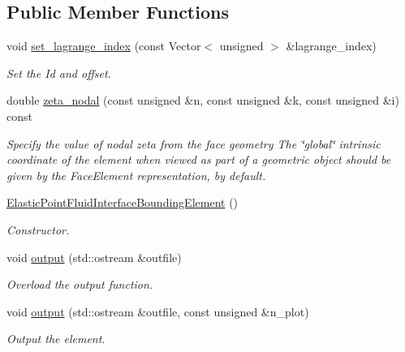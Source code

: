 \subsection*{Public Member Functions}
\begin{DoxyCompactItemize}
\item 
void \hyperlink{classoomph_1_1ElasticPointFluidInterfaceBoundingElement_a9a36ac6e616ed271507cbfe26de085b4}{set\+\_\+lagrange\+\_\+index} (const Vector$<$ unsigned $>$ \&lagrange\+\_\+index)
\begin{DoxyCompactList}\small\item\em Set the Id and offset. \end{DoxyCompactList}\item 
double \hyperlink{classoomph_1_1ElasticPointFluidInterfaceBoundingElement_a9d72fee284b866769347fb471c5828ad}{zeta\+\_\+nodal} (const unsigned \&n, const unsigned \&k, const unsigned \&i) const
\begin{DoxyCompactList}\small\item\em Specify the value of nodal zeta from the face geometry The \char`\"{}global\char`\"{} intrinsic coordinate of the element when viewed as part of a geometric object should be given by the Face\+Element representation, by default. \end{DoxyCompactList}\item 
\hyperlink{classoomph_1_1ElasticPointFluidInterfaceBoundingElement_a18e40e63a31953ad02cb0a2e7d0577b3}{Elastic\+Point\+Fluid\+Interface\+Bounding\+Element} ()
\begin{DoxyCompactList}\small\item\em Constructor. \end{DoxyCompactList}\item 
void \hyperlink{classoomph_1_1ElasticPointFluidInterfaceBoundingElement_a3a09e94ba3bf5ce0922bc4b75097078c}{output} (std\+::ostream \&outfile)
\begin{DoxyCompactList}\small\item\em Overload the output function. \end{DoxyCompactList}\item 
void \hyperlink{classoomph_1_1ElasticPointFluidInterfaceBoundingElement_a20c0678a9fdd6ef91fe48aa1b9209c38}{output} (std\+::ostream \&outfile, const unsigned \&n\+\_\+plot)
\begin{DoxyCompactList}\small\item\em Output the element. \end{DoxyCompactList}\item 

\end{DoxyCompactItemize}
